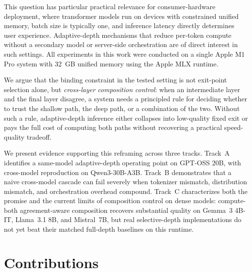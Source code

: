 \documentclass[11pt]{article}
\begin{document}
This question has particular practical relevance for consumer-hardware deployment, where transformer models run on devices with constrained unified memory, batch size is typically one, and inference latency directly determines user experience. Adaptive-depth mechanisms that reduce per-token compute without a secondary model or server-side orchestration are of direct interest in such settings. All experiments in this work were conducted on a single Apple M1 Pro system with 32~GB unified memory using the Apple MLX runtime.

We argue that the binding constraint in the tested setting is not exit-point selection alone, but \emph{cross-layer composition control}: when an intermediate layer and the final layer disagree, a system needs a principled rule for deciding whether to trust the shallow path, the deep path, or a combination of the two. Without such a rule, adaptive-depth inference either collapses into low-quality fixed exit or pays the full cost of computing both paths without recovering a practical speed-quality tradeoff.

We present evidence supporting this reframing across three tracks. Track~A identifies a same-model adaptive-depth operating point on GPT-OSS 20B, with cross-model reproduction on Qwen3-30B-A3B. Track~B demonstrates that a naive cross-model cascade can fail severely when tokenizer mismatch, distribution mismatch, and orchestration overhead compound. Track~C characterizes both the promise and the current limits of composition control on dense models: compute-both agreement-aware composition recovers substantial quality on Gemma~3 4B-IT, Llama~3.1 8B, and Mistral~7B, but real selective-depth implementations do not yet beat their matched full-depth baselines on this runtime.

\section{Contributions}
\end{document}

